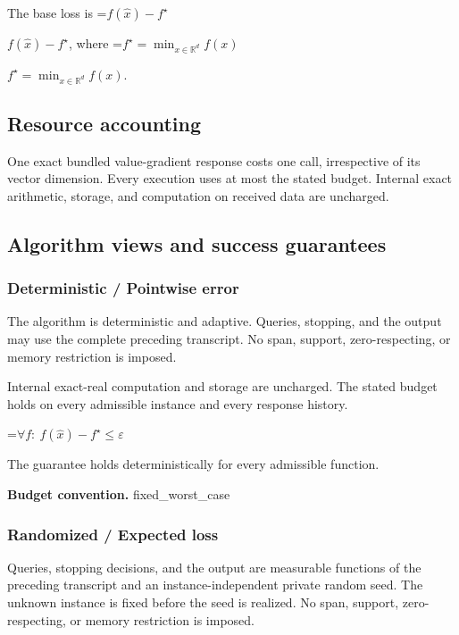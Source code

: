 \documentclass[10pt,a4paper]{article}
\newcommand{\AtlasMath}[1]{\par\begingroup\centering\setbox0=\hbox{$\displaystyle #1$}\ifdim\wd0>1.4\linewidth\typeout{ATLAS WIDE FORMULA: \the\wd0}\fi\ifdim\wd0>\linewidth\resizebox{\linewidth}{!}{\box0}\else\box0\fi\par\endgroup}
\newcommand{\AtlasInlineMath}[1]{\begingroup\setbox0=\hbox{$#1$}\ifdim\wd0>.4\linewidth\endgroup\AtlasMath{#1}\else\endgroup$#1$\fi}
\begin{document}
The base loss is \AtlasInlineMath{f(\widehat x)-f^\star}, where \AtlasInlineMath{f^\star=\min_{x\in\mathbb R^d}f(x)}.



\subsection{Resource accounting}


One exact bundled value-gradient response costs one call, irrespective of its vector dimension. Every execution uses at most the stated budget. Internal exact arithmetic, storage, and computation on received data are uncharged.



\subsection{Algorithm views and success guarantees}


\subsubsection{Deterministic / Pointwise error}


The algorithm is deterministic and adaptive. Queries, stopping, and the output may use the complete preceding transcript. No span, support, zero-respecting, or memory restriction is imposed.



Internal exact-real computation and storage are uncharged. The stated budget holds on every admissible instance and every response history.




\AtlasMath{\forall f:\ f(\widehat x)-f^\star\le\varepsilon}




The guarantee holds deterministically for every admissible function.



\textbf{Budget convention.} fixed\_worst\_case



\subsubsection{Randomized / Expected loss}


Queries, stopping decisions, and the output are measurable functions of the preceding transcript and an instance-independent private random seed. The unknown instance is fixed before the seed is realized. No span, support, zero-respecting, or memory restriction is imposed.
\end{document}
